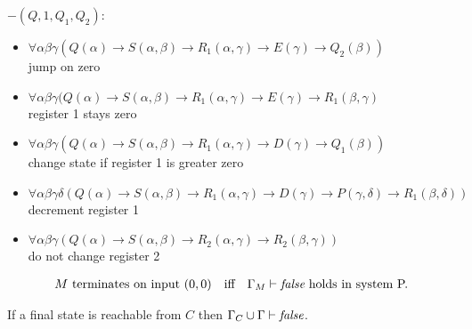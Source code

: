 $-(Q,1,Q_1,Q_2):$
\begin{itemize}
\item $\forall\alpha\beta\gamma(Q(\alpha)\to S(\alpha,\beta)\to R_1(\alpha,\gamma)\to E(\gamma)\to Q_2(\beta))$\\jump on zero
\item $\forall\alpha\beta\gamma(Q(\alpha)\to S(\alpha,\beta)\to R_1(\alpha,\gamma)\to E(\gamma)\to R_1(\beta,\gamma)$\\register 1 stays zero
\item $\forall\alpha\beta\gamma(Q(\alpha)\to S(\alpha,\beta)\to R_1(\alpha,\gamma)\to D(\gamma)\to Q_1(\beta))$\\change state if register 1 is greater zero
\item $\forall\alpha\beta\gamma\delta(Q(\alpha)\to S(\alpha,\beta)\to R_1(\alpha,\gamma)\to D(\gamma) \to P(\gamma,\delta)\to R_1(\beta,\delta))$\\decrement register 1
\item $\forall\alpha\beta\gamma(Q(\alpha)\to S(\alpha,\beta)\to R_2(\alpha,\gamma)\to R_2(\beta,\gamma))$\\do not change register 2
\end{itemize}
\begin{lemma}
\begin{align*}
&\text{$M$ terminates on input $(0,0)$}&& \text{iff} &\text{$\Gamma_M\vdash\emph{false}$ holds in system P.}
\end{align*}
\end{lemma}
\begin{claim}
If a final state is reachable from $C$ then $\Gamma_C\cup\Gamma\vdash\emph{false}$.
\end{claim}
